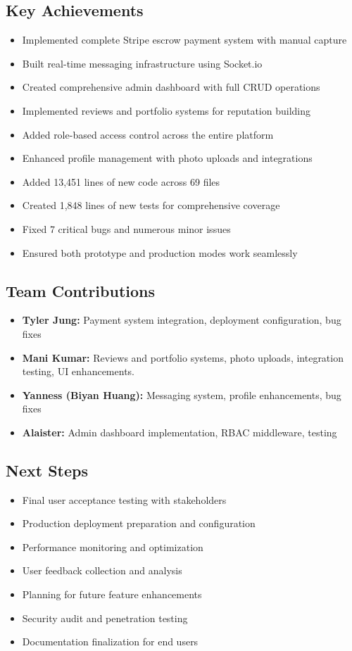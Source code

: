 \documentclass[11pt]{article}
\begin{document}
\subsection{Key Achievements}
\begin{itemize}[leftmargin=1.4em]
  \item Implemented complete Stripe escrow payment system with manual capture
  \item Built real-time messaging infrastructure using Socket.io
  \item Created comprehensive admin dashboard with full CRUD operations
  \item Implemented reviews and portfolio systems for reputation building
  \item Added role-based access control across the entire platform
  \item Enhanced profile management with photo uploads and integrations
  \item Added 13,451 lines of new code across 69 files
  \item Created 1,848 lines of new tests for comprehensive coverage
  \item Fixed 7 critical bugs and numerous minor issues
  \item Ensured both prototype and production modes work seamlessly
\end{itemize}

\subsection{Team Contributions}
\begin{itemize}[leftmargin=1.4em]
  \item \textbf{Tyler Jung:} Payment system integration, deployment configuration, bug fixes
  \item \textbf{Mani Kumar:} Reviews and portfolio systems, photo uploads, integration testing, UI enhancements.
  \item \textbf{Yanness (Biyan Huang):} Messaging system, profile enhancements, bug fixes
  \item \textbf{Alaister:} Admin dashboard implementation, RBAC middleware, testing
\end{itemize}

\subsection{Next Steps}
\begin{itemize}[leftmargin=1.4em]
  \item Final user acceptance testing with stakeholders
  \item Production deployment preparation and configuration
  \item Performance monitoring and optimization
  \item User feedback collection and analysis
  \item Planning for future feature enhancements
  \item Security audit and penetration testing
  \item Documentation finalization for end users
\end{itemize}
\end{document}
